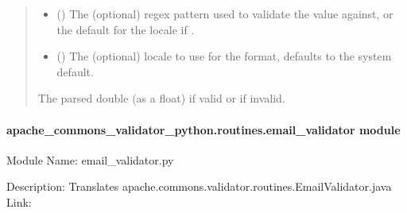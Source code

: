 \documentclass[letterpaper,10pt,english]{sphinxmanual}
\begin{document}
\begin{fulllineitems}
\begin{fulllineitems}
\begin{quote}
\begin{description}
\begin{itemize}
\item {} 
\sphinxAtStartPar
{} () \textendash{} The (optional) regex pattern used to validate the value against,
or the default for the locale if .

\item {} 
\sphinxAtStartPar
{} () \textendash{} The (optional) locale to use for the format, defaults to the system default.

\end{itemize}

\sphinxAtStartPar
The parsed double (as a float) if valid or  if invalid.

\end{description}\end{quote}

\end{fulllineitems}


\end{fulllineitems}



\paragraph{apache\_commons\_validator\_python.routines.email\_validator module}
\label{\detokenize{apache_commons_validator_python.routines:module-apache_commons_validator_python.routines.email_validator}}\label{\detokenize{apache_commons_validator_python.routines:apache-commons-validator-python-routines-email-validator-module}}
\sphinxAtStartPar
Module Name: email\_validator.py

\sphinxAtStartPar
Description: Translates apache.commons.validator.routines.EmailValidator.java
Link: 
\end{document}
